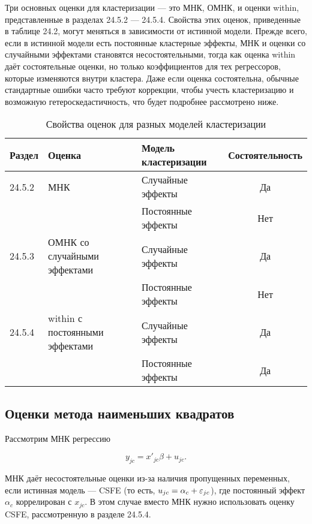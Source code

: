 Три основных оценки для кластеризации --- это МНК, ОМНК, и оценки within, представленные в разделах 24.5.2 --- 24.5.4. Свойства этих оценок, приведенные в таблице 24.2, могут меняться в зависимости от истинной модели. Прежде всего, если в истинной модели есть постоянные кластерные эффекты, МНК и оценки со случайными эффектами становятся несостоятельными, тогда как оценка within даёт состоятельные оценки, но только коэффициентов для тех регрессоров, которые изменяются внутри кластера. Даже если оценка состоятельна, обычные стандартные ошибки часто требуют коррекции, чтобы учесть кластеризацию и возможную гетероскедастичность, что будет подробнее рассмотрено ниже. 

\begin{table}[h]
\caption{\label{tab:pred} Свойства оценок для разных моделей кластеризации}
\begin{center}
\begin{tabular}{lllc}
\hline
\hline
Раздел & Оценка & Модель кластеризации &  Состоятельность \\
\hline
24.5.2 & МНК & Случайные эффекты & Да \\
  &   & Постоянные эффекты & Нет \\
24.5.3 & ОМНК со случайными эффектами & Случайные эффекты & Да \\
  &   & Постоянные эффекты & Нет \\
24.5.4 & within с постоянными эффектами & Случайные эффекты & Да \\
  &   & Постоянные эффекты & Да \\
\hline
\hline
\end{tabular}
\end{center}
\end{table}

\subsection{Оценки метода наименьших квадратов}

Рассмотрим МНК регрессию

\begin{equation}
\label{eq24.28}
y_{jc} = x'_{jc} \beta + u_{jc}.
\end{equation}

МНК даёт несостоятельные оценки из-за наличия пропущенных переменных, если истинная модель --- CSFE (то есть, $u_{jc} = \alpha_c + \varepsilon_{jc}$), где постоянный эффект $\alpha_c$ коррелирован с $x_{jc}$. В этом случае вместо МНК нужно использовать оценку CSFE, рассмотренную в разделе 24.5.4. 

